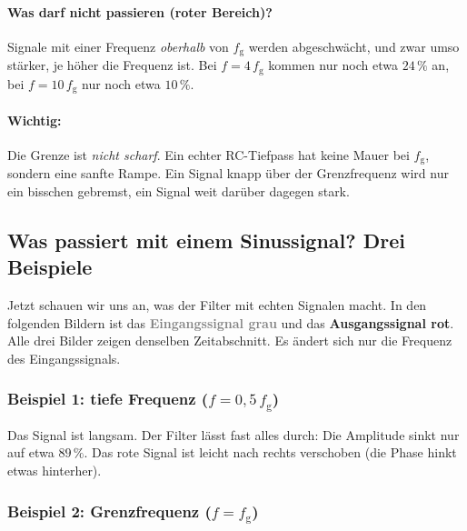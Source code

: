 \documentclass[a4paper,12pt,twoside]{report}
\theoremstyle{definition}
\begin{document}
\paragraph{Was darf nicht passieren (roter Bereich)?}
Signale mit einer Frequenz \emph{oberhalb} von $f_\mathrm{g}$ werden
abgeschwächt, und zwar umso stärker, je höher die Frequenz ist. Bei
$f = 4\,f_\mathrm{g}$ kommen nur noch etwa $24\,\%$ an, bei
$f = 10\,f_\mathrm{g}$ nur noch etwa $10\,\%$.

\paragraph{Wichtig:}
Die Grenze ist \emph{nicht scharf}. Ein echter RC-Tiefpass hat keine
Mauer bei $f_\mathrm{g}$, sondern eine sanfte Rampe. Ein Signal knapp
über der Grenzfrequenz wird nur ein bisschen gebremst, ein Signal weit
darüber dagegen stark.

\subsection*{Was passiert mit einem Sinussignal? Drei Beispiele}

Jetzt schauen wir uns an, was der Filter mit echten Signalen macht. In
den folgenden Bildern ist das \textcolor{gray}{\textbf{Eingangssignal grau}}
und das \textcolor{red!70!black}{\textbf{Ausgangssignal rot}}. Alle drei
Bilder zeigen denselben Zeitabschnitt. Es ändert sich nur die Frequenz
des Eingangssignals.

\subsubsection*{Beispiel 1: tiefe Frequenz ($f = 0{,}5\,f_\mathrm{g}$)}

\begin{center}
\end{center}

Das Signal ist langsam. Der Filter lässt fast alles durch: Die Amplitude
sinkt nur auf etwa $89\,\%$. Das rote Signal ist leicht nach rechts
verschoben (die Phase hinkt etwas hinterher).

\subsubsection*{Beispiel 2: Grenzfrequenz ($f = f_\mathrm{g}$)}

\begin{center}
\end{center}
\end{document}
